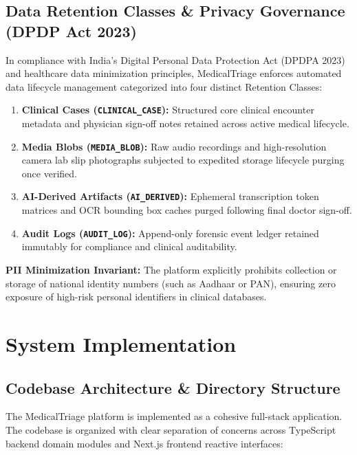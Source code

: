 \documentclass[11pt,a4paper,oneside]{report}
\begin{document}
\section{Data Retention Classes \& Privacy Governance (DPDP Act 2023)}
In compliance with India's Digital Personal Data Protection Act (DPDPA 2023) and healthcare data minimization principles, MedicalTriage enforces automated data lifecycle management categorized into four distinct Retention Classes:
\begin{enumerate}[leftmargin=20pt]
  \item \textbf{Clinical Cases (\texttt{CLINICAL\_CASE}):} Structured core clinical encounter metadata and physician sign-off notes retained across active medical lifecycle.
  \item \textbf{Media Blobs (\texttt{MEDIA\_BLOB}):} Raw audio recordings and high-resolution camera lab slip photographs subjected to expedited storage lifecycle purging once verified.
  \item \textbf{AI-Derived Artifacts (\texttt{AI\_DERIVED}):} Ephemeral transcription token matrices and OCR bounding box caches purged following final doctor sign-off.
  \item \textbf{Audit Logs (\texttt{AUDIT\_LOG}):} Append-only forensic event ledger retained immutably for compliance and clinical auditability.
\end{enumerate}

\noindent \textbf{PII Minimization Invariant:} The platform explicitly prohibits collection or storage of national identity numbers (such as Aadhaar or PAN), ensuring zero exposure of high-risk personal identifiers in clinical databases.

\chapter{System Implementation}

\section{Codebase Architecture \& Directory Structure}
The MedicalTriage platform is implemented as a cohesive full-stack application. The codebase is organized with clear separation of concerns across TypeScript backend domain modules and Next.js frontend reactive interfaces:
\end{document}
